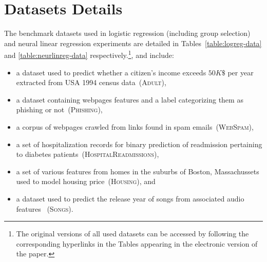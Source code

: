\section{Datasets Details}
\label{sec:data-details}

The benchmark datasets used in logistic regression (including group selection) and neural linear regression experiments are detailed in Tables~\ref{table:logreg-data} and \ref{table:neurlinreg-data} respectively.\footnote{The original versions of all used datasets can be accessed by following the corresponding hyperlinks in the Tables appearing in the electronic version of the paper.}, and include: 
\begin{itemize}
	\item a dataset used to predict whether a citizen's income exceeds $50K \$$ per year extracted from USA 1994 census data~(\textsc{Adult}),
	\item a dataset containing webpages features and a label categorizing them as phishing or not~(\textsc{Phishing}),
	\item a corpus of webpages crawled from links found in spam emails~(\textsc{WebSpam}),
	\item a set of hospitalization records for binary prediction of readmission pertaining to diabetes patients~(\textsc{HospitalReadmissions}),
	\item a set of various features from homes in the suburbs of Boston, Massachussets used to model housing price~(\textsc{Housing}), and
	\item a dataset used to predict the release year of songs from associated audio features ~(\textsc{Songs}).
\end{itemize} 

